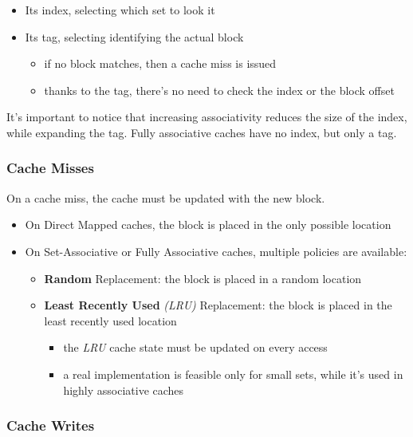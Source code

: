 \documentclass[english]{article}
\begin{document}
\begin{itemize}
  \item Its index, selecting which set to look it
  \item Its tag, selecting identifying the actual block
        \begin{itemize}
          \item if no block matches, then a cache miss is issued
          \item thanks to the tag, there's no need to check the index or the block offset
        \end{itemize}
\end{itemize}

It's important to notice that increasing associativity reduces the size of the index, while expanding the tag.
Fully associative caches have no index, but only a tag.

\subsubsection{Cache Misses}

On a cache miss, the cache must be updated with the new block.

\begin{itemize}
  \item On Direct Mapped caches, the block is placed in the only possible location
  \item On Set-Associative or Fully Associative caches, multiple policies are available:
        \begin{itemize}
          \item \textbf{Random} Replacement: the block is placed in a random location
          \item \textbf{Least Recently Used} \textit{(LRU)} Replacement: the block is placed in the least recently used location
                \begin{itemize}
                  \item the \textit{LRU} cache state must be updated on every access
                  \item a real implementation is feasible only for small sets, while it's used in highly associative caches
                \end{itemize}
        \end{itemize}
\end{itemize}

\subsubsection{Cache Writes}
\end{document}
